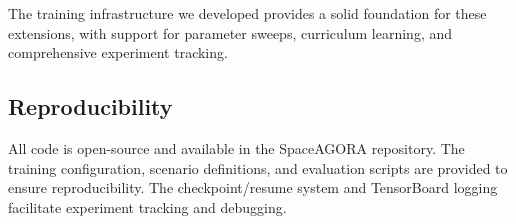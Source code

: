 The training infrastructure we developed provides a solid foundation for these extensions, with support for parameter sweeps, curriculum learning, and comprehensive experiment tracking.

\subsection{Reproducibility}

All code is open-source and available in the SpaceAGORA repository. The training configuration, scenario definitions, and evaluation scripts are provided to ensure reproducibility. The checkpoint/resume system and TensorBoard logging facilitate experiment tracking and debugging.
